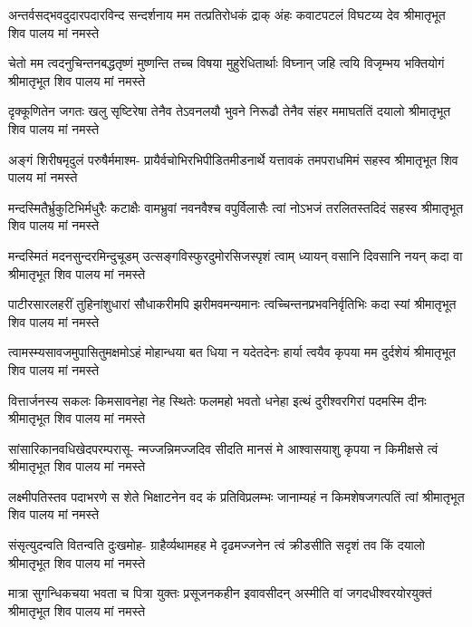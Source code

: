 \fourlineindentedshloka
{अन्तर्वसद्भवदुदारपदारविन्द}
{सन्दर्शनाय मम तत्प्रतिरोधकं द्राक्}
{अंहः कवाटपटलं विघटय्य देव}
{श्रीमातृभूत शिव पालय मां नमस्ते} %

\fourlineindentedshloka
{चेतो मम त्वदनुचिन्तनबद्धतृष्णं}
{मुष्णन्ति तच्च विषया मुहुरेधितार्थाः}
{विघ्नान् जहि त्वयि विजृम्भय भक्तियोगं}
{श्रीमातृभूत शिव पालय मां नमस्ते} %

\fourlineindentedshloka
{दृक्कूणितेन जगतः खलु सृष्टिरेषा}
{तेनैव तेऽवनलयौ भुवने निरूढौ}
{तेनैव संहर ममाघततिं दयालो}
{श्रीमातृभूत शिव पालय मां नमस्ते} %

\fourlineindentedshloka
{अङ्गं शिरीषमृदुलं परुषैर्ममाश्म-}
{प्रायैर्वचोभिरभिपीडितमीडनार्थे}
{यत्तावकं तमपराधमिमं सहस्व}
{श्रीमातृभूत शिव पालय मां नमस्ते} %

\fourlineindentedshloka
{मन्दस्मितैर्भ्रुकुटिभिर्मधुरैः कटाक्षैः}
{वामभ्रुवां नवनवैश्च वपुर्विलासैः}
{त्वां नोऽभजं तरलितस्तदिदं सहस्व}
{श्रीमातृभूत शिव पालय मां नमस्ते} %

\fourlineindentedshloka
{मन्दस्मितं मदनसुन्दरमिन्दुचूडम्}
{उत्सङ्गविस्फुरदुमोरसिजस्पृशं त्वाम्}
{ध्यायन् वसानि दिवसानि नयन् कदा वा}
{श्रीमातृभूत शिव पालय मां नमस्ते} %

\fourlineindentedshloka
{पाटीरसारलहरीं तुहिनांशुधारां}
{सौधाकरीमपि झरीमवमन्यमानः}
{त्वच्चिन्तनप्रभवनिर्वृतिभिः कदा स्यां}
{श्रीमातृभूत शिव पालय मां नमस्ते} %

\fourlineindentedshloka
{त्वामस्म्यसावजमुपासितुमक्षमोऽहं}
{मोहान्धया बत धिया न यदेतदेनः}
{हार्या त्वयैव कृपया मम दुर्दशेयं}
{श्रीमातृभूत शिव पालय मां नमस्ते} %

\fourlineindentedshloka
{वित्तार्जनस्य सकलः किमसावनेहा}
{नेह स्थितेः फलमहो भवतो धनेहा}
{इत्थं दुरीश्वरगिरां पदमस्मि दीनः}
{श्रीमातृभूत शिव पालय मां नमस्ते} %

\fourlineindentedshloka
{सांसारिकानवधिखेदपरम्परासू-}
{न्मज्जन्निमज्जदिव सीदति मानसं मे}
{आश्वासयाशु कृपया न किमीक्षसे त्वं}
{श्रीमातृभूत शिव पालय मां नमस्ते} %

\fourlineindentedshloka
{लक्ष्मीपतिस्तव पदाभरणे स शेते}
{भिक्षाटनेन वद कं प्रतिविप्रलम्भः}
{जानाम्यहं न किमशेषजगत्पतिं त्वां}
{श्रीमातृभूत शिव पालय मां नमस्ते} %

\fourlineindentedshloka
{संसृत्युदन्वति वितन्वति दुःखमोह-}
{ग्राहैर्व्यथामहह मे दृढमज्जनेन}
{त्वं क्रीडसीति सदृशं तव किं दयालो}
{श्रीमातृभूत शिव पालय मां नमस्ते} %

\fourlineindentedshloka
{मात्रा सुगन्धिकचया भवता च पित्रा}
{युक्तः प्रसूजनकहीन इवावसीदन्}
{अस्मीति वां जगदधीश्वरयोरयुक्तं}
{श्रीमातृभूत शिव पालय मां नमस्ते} %

